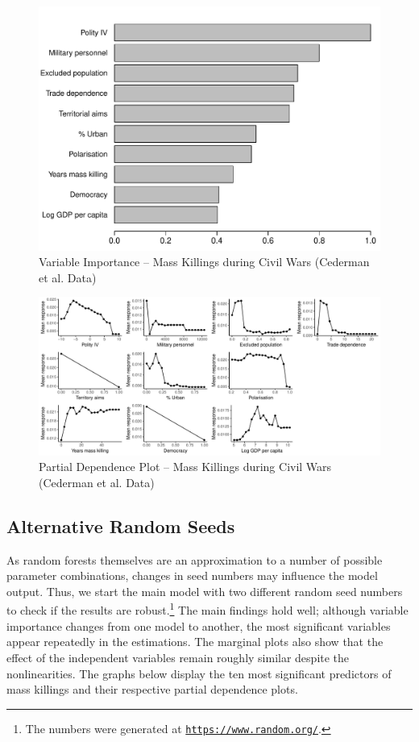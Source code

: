 \documentclass[a4paper,12pt]{article}
\begin{document}
\begin{figure}[H]
    \centering
    \includegraphics{images/rf-eth.pdf}
    \caption{Variable Importance -- Mass Killings during Civil Wars (Cederman et al. Data)}
    \label{fig:rf-mk-ucdp}
\end{figure}

\newpage 

\begin{figure}[H]
    \centering
    \includegraphics[width=.98\textheight,angle=90]{images/rf-eth-pd.pdf}
    \caption{Partial Dependence Plot -- Mass Killings during Civil Wars (Cederman et al. Data)}
    \label{fig:rf-mk-ucdp-pd}
\end{figure}

\newpage

\subsection{Alternative Random Seeds}

As random forests themselves are an approximation to a number of possible parameter combinations, changes in seed numbers may influence the model output. Thus, we start the main model with two different random seed numbers to check if the results are robust.\footnote{The numbers were generated at \href{https://www.random.org/}{\texttt{https://www.random.org/}}.} The main findings hold well; although variable importance changes from one model to another, the most significant variables appear repeatedly in the estimations. The marginal plots also show that the effect of the independent variables remain roughly similar despite the nonlinearities. The graphs below display the ten most significant predictors of mass killings and their respective partial dependence plots.
\end{document}
